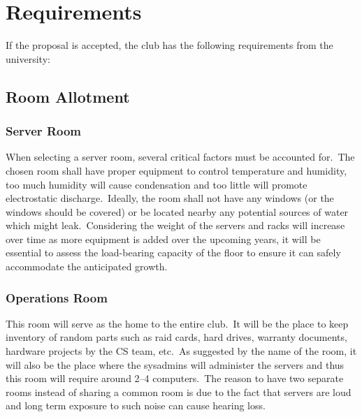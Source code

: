 \section{Requirements}\label{sec:requirements}
If the proposal is accepted, the club has the following requirements from the university:


\subsection{Room Allotment}\label{subsec:room-allotment}

\subsubsection{Server Room}
When selecting a server room, several critical factors must be accounted for.\ The chosen room shall have proper
equipment to control temperature and humidity, too much humidity will cause condensation and too little will promote
electrostatic discharge.\ Ideally, the room shall not have any windows (or the windows should be covered) or be located
nearby any potential sources of water which might leak.\ Considering the weight of the servers and racks will increase
over time as more equipment is added over the upcoming years, it will be essential to assess the load-bearing capacity
of the floor to ensure it can safely accommodate the anticipated growth.

\subsubsection{Operations Room}
This room will serve as the home to the entire club.\ It will be the place to keep inventory of random parts such as
raid cards, hard drives, warranty documents, hardware projects by the CS team, etc.\ As suggested by the name of the
room, it will also be the place where the sysadmins will administer the servers and thus this room will require around
2--4 computers.\ The reason to have two separate rooms instead of sharing a common room is due to the fact that servers
are loud and long term exposure to such noise can cause hearing loss.


